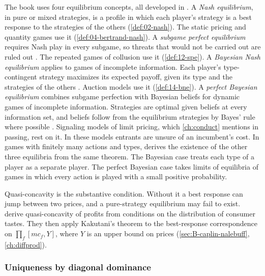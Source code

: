 \begin{remark}\label{rem:B-eq-concepts}
The book uses four equilibrium concepts, all developed in \citet[Sections~11.2--11.5]{Tirole1988}. A
\emph{Nash equilibrium}, in pure or mixed strategies, is a profile in which each player's strategy is a best
response to the strategies of the others (\cref{def:02-nash}). The static pricing and quantity games use it
(\cref{def:04-bertrand-nash}). A \emph{subgame perfect equilibrium} requires Nash play in every subgame, so
threats that would not be carried out are ruled out \citep[Section~11.3]{Tirole1988}. The repeated games of
collusion use it (\cref{def:12-spe}). A \emph{Bayesian Nash equilibrium} applies to games of incomplete
information. Each player's type-contingent strategy maximizes its expected payoff, given its type and the
strategies of the others \citep[Section~11.4]{Tirole1988}. Auction models use it (\cref{def:14-bne}). A
\emph{perfect Bayesian equilibrium} combines subgame perfection with Bayesian beliefs for dynamic games of
incomplete information. Strategies are optimal given beliefs at every information set, and beliefs follow from
the equilibrium strategies by Bayes' rule where possible \citep[Section~11.5]{Tirole1988}. Signaling models of
limit pricing, which \cref{ch:conduct} mentions in passing, rest on it. In these models entrants are unsure of
an incumbent's cost. In games with finitely many actions and types, \citet[Section~11.6.1]{Tirole1988} derives
the existence of the other three equilibria from the same theorem. The Bayesian case treats each type of a player as a separate player. The perfect Bayesian
case takes limits of equilibria of games in which every action is played with a small positive probability.
\end{remark}

Quasi-concavity is the substantive condition. Without it a best response can jump between two prices, and a
pure-strategy equilibrium may fail to exist. \citet{CaplinNalebuff1991} derive quasi-concavity of profits
from conditions on the distribution of consumer tastes. They then apply Kakutani's theorem to the
best-response correspondence on $\prod_f[mc_f, Y]$, where $Y$ is an upper bound on prices
(\cref{sec:B-caplin-nalebuff}, \cref{ch:diffprod}).

\subsubsection{Uniqueness by diagonal dominance}

